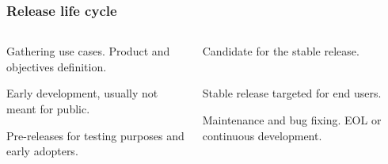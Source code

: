 \documentclass[aspectratio=169]{beamer}              %
\begin{document}
\begin{frame}
	\frametitle{Release life cycle}
	
\begin{columns}
\begin{column}{0.5\textwidth}
   	\begin{block}{\color{orange}{1. Planning}}
   		\vspace{1mm}
Gathering use cases. Product and objectives definition.
	\end{block}
	\begin{block}{\color{orange}{2. Pre-Alpha}}
   		\vspace{1mm}
Early development, usually not meant for public.
     \end{block}
         \begin{block}{\color{orange}{3. Alpha/Beta}}
   		\vspace{1mm}
Pre-releases for testing purposes and early adopters.
     \end{block}
     
\end{column}
\begin{column}{0.5\textwidth} 
\begin{block}{\color{orange}{4. Release candidate (RC)}}
   		\vspace{1mm}
Candidate for the stable release.\\~
     \end{block}
      \begin{block}{\color{orange}{5. Stable release}}
   		\vspace{1mm}
Stable release targeted for end users.
     \end{block}
      \begin{block}{\color{orange}{6. Mature project/Maintenance}}
   		\vspace{1mm}
Maintenance and bug fixing. EOL or continuous development.
     \end{block}
\end{column}
\end{columns}

\end{frame}
\end{document}
